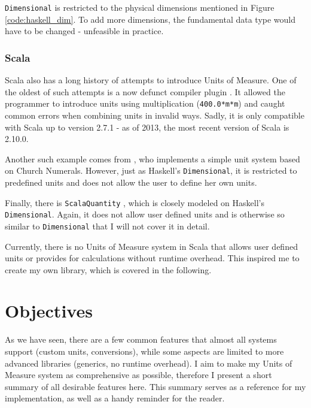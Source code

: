 \documentclass[12pt,oneside,a4paper]{scrbook}
\begin{document}
\verb/Dimensional/ is restricted to the physical dimensions mentioned in Figure \ref{code:haskell_dim}. To add more dimensions, the fundamental data type would have to be changed - unfeasible in practice.



\subsection{Scala}
Scala also has a long history of attempts to introduce Units of Measure. One of the oldest of such attempts is a now defunct compiler plugin \citep{Nygard09}. It allowed the programmer to introduce units using multiplication (\verb/400.0*m*m/) and caught common errors when combining units in invalid ways. Sadly, it is only compatible with Scala up to version 2.7.1 - as of 2013, the most recent version of Scala is 2.10.0.

Another such example comes from \citep{McBeath08}, who implements a simple unit system based on Church Numerals. However, just as Haskell's \verb/Dimensional/, it is restricted to predefined units and does not allow the user to define her own units.

Finally, there is \verb/ScalaQuantity/ \citep{Hans12}, which is closely modeled on Haskell's \verb/Dimensional/. Again, it does not allow user defined units and is otherwise so similar to \verb/Dimensional/ that I will not cover it in detail.

Currently, there is no Units of Measure system in Scala that allows user defined units or provides for calculations without runtime overhead. This inspired me to create my own library, which is covered in the following.




\chapter{Objectives}
As we have seen, there are a few common features that almost all systems support (custom units, conversions), while some aspects are limited to more advanced libraries (generics, no runtime overhead). I aim to make my Units of Measure system as comprehensive as possible, therefore I present a short summary of all desirable features here. This summary serves as a reference for my implementation, as well as a handy reminder for the reader.
\end{document}
